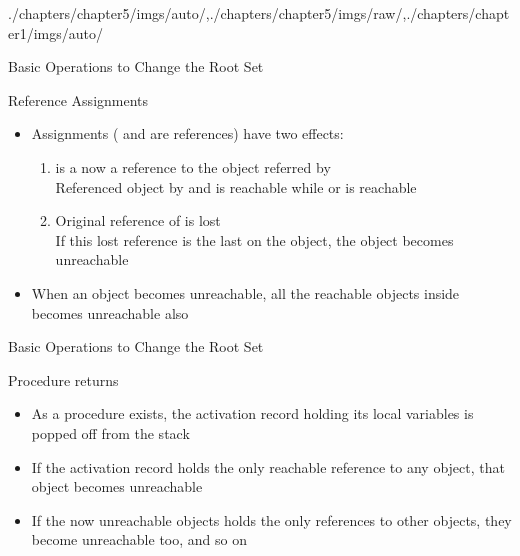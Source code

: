 \begin{graphicspathcontext}{{./chapters/chapter5/imgs/auto/},{./chapters/chapter5/imgs/raw/},{./chapters/chapter1/imgs/auto/}}
\begin{bibunit}[apalike]
\begin{frame}{{Basic Operations} to Change the Root Set \insertcontinuationtext}
	\begin{block}{Reference Assignments}
		\begin{itemize}
			\item Assignments  ( and  are references) have two effects:
			\begin{enumerate}
				\item {} is a now a reference to the object referred by  \\
				Referenced object by  and  is reachable while  or  is reachable
				\item Original reference of  is lost \\
				If this lost reference is the last on the object, the object becomes unreachable
			\end{enumerate}
			\item When an object becomes unreachable, all the reachable objects inside becomes unreachable also
		\end{itemize}
	\end{block}
\end{frame}

\begin{frame}{{Basic Operations} to Change the Root Set \insertcontinuationtext}
	\begin{block}{Procedure returns}
		\begin{itemize}
			\item As a procedure exists, the activation record holding its local variables is popped off from the stack
			\item If the activation record holds the only reachable reference to any object, that object becomes unreachable
			\item If the now unreachable objects holds the only references to other objects, they become unreachable too, and so on
		\end{itemize}
	\end{block}
\end{frame}


\end{bibunit}
\end{graphicspathcontext}
